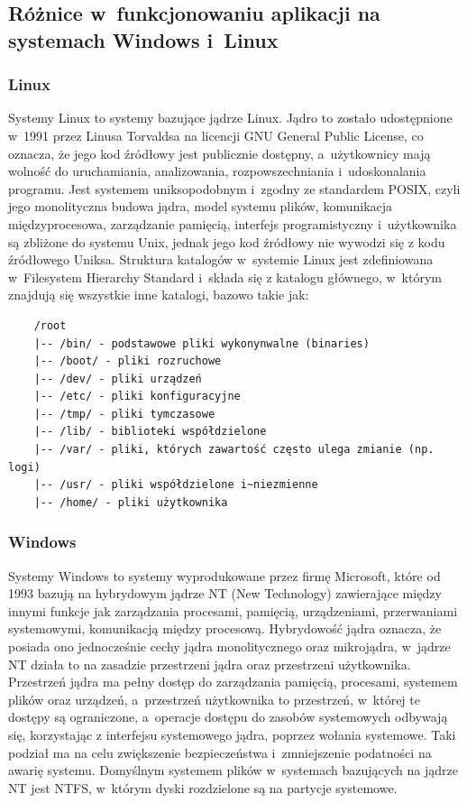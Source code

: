 \subsection{Różnice w~funkcjonowaniu aplikacji na systemach Windows i~Linux}
\subsubsection{Linux}
Systemy Linux to systemy bazujące jądrze Linux. Jądro to zostało udostępnione w~1991 przez Linusa Torvaldsa na licencji GNU General Public License, co oznacza, że jego kod źródłowy jest publicznie dostępny, a~użytkownicy mają wolność do uruchamiania, analizowania, rozpowszechniania i~udoskonalania programu.
Jest systemem uniksopodobnym i~zgodny ze standardem POSIX, czyli jego monolityczna budowa jądra, model systemu plików, komunikacja międzyprocesowa, zarządzanie pamięcią, interfejs programistyczny i~użytkownika są zbliżone do systemu Unix, jednak jego kod źródłowy nie wywodzi się z kodu źródłowego Uniksa. Struktura katalogów w~systemie Linux jest zdefiniowana w~Filesystem Hierarchy Standard \cite{linuxFhs} i~składa się z katalogu głównego, w~którym znajdują się wszystkie inne katalogi, bazowo takie jak:
\begin{verbatim}
    /root
    |-- /bin/ - podstawowe pliki wykonynwalne (binaries)
    |-- /boot/ - pliki rozruchowe
    |-- /dev/ - pliki urządzeń
    |-- /etc/ - pliki konfiguracyjne
    |-- /tmp/ - pliki tymczasowe
    |-- /lib/ - biblioteki współdzielone
    |-- /var/ - pliki, których zawartość często ulega zmianie (np. logi)
    |-- /usr/ - pliki współdzielone i~niezmienne
    |-- /home/ - pliki użytkownika
\end{verbatim}

\subsubsection{Windows}
Systemy Windows to systemy wyprodukowane przez firmę Microsoft, które od 1993 bazują na hybrydowym jądrze\cite{windowsHybridKernel} NT (New Technology)\cite{windowsNT} zawierające między innymi funkcje jak zarządzania procesami, pamięcią, urządzeniami, przerwaniami systemowymi, komunikacją między procesową. Hybrydowość jądra oznacza, że posiada ono jednocześnie cechy jądra monolitycznego oraz mikrojądra, w~jądrze NT działa to na zasadzie przestrzeni jądra oraz przestrzeni użytkownika. Przestrzeń jądra ma pełny dostęp do zarządzania pamięcią, procesami, systemem plików oraz urządzeń, a~przestrzeń użytkownika to przestrzeń, w~której te dostępy są ograniczone, a~operacje dostępu do zasobów systemowych odbywają się, korzystając z interfejsu systemowego jądra, poprzez wołania systemowe. Taki podział ma na celu zwiększenie bezpieczeństwa i~zmniejszenie podatności na awarię systemu. Domyślnym systemem plików w~systemach bazujących na jądrze NT jest NTFS, w~którym dyski rozdzielone są na partycje systemowe.

